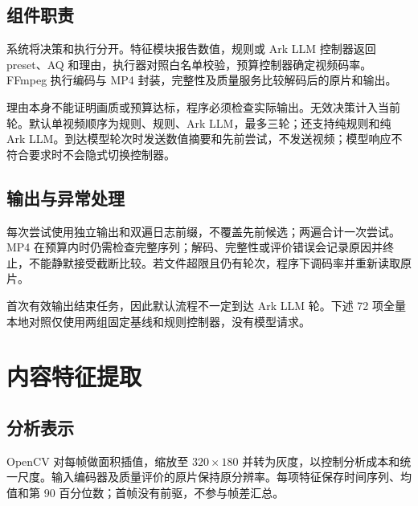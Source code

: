 \documentclass[UTF8,12pt,a4paper,twocolumn]{ctexart}
\begin{document}
\subsection{组件职责}
系统将决策和执行分开。特征模块报告数值，规则或 Ark LLM 控制器返回 preset、AQ 和理由，执行器对照白名单校验，预算控制器确定视频码率。FFmpeg 执行编码与 MP4 封装，完整性及质量服务比较解码后的原片和输出。

理由本身不能证明画质或预算达标，程序必须检查实际输出。无效决策计入当前轮。默认单视频顺序为规则、规则、Ark LLM，最多三轮；还支持纯规则和纯 Ark LLM。到达模型轮次时发送数值摘要和先前尝试，不发送视频；模型响应不符合要求时不会隐式切换控制器。
\begin{table}[H]\centering\caption{任务阶段及记录的证据。}\end{table}
\subsection{输出与异常处理}
每次尝试使用独立输出和双遍日志前缀，不覆盖先前候选；两遍合计一次尝试。MP4 在预算内时仍需检查完整序列；解码、完整性或评价错误会记录原因并终止，不能静默接受截断比较。若文件超限且仍有轮次，程序下调码率并重新读取原片。

首次有效输出结束任务，因此默认流程不一定到达 Ark LLM 轮。下述 72 项全量本地对照仅使用两组固定基线和规则控制器，没有模型请求。
\section{内容特征提取}
\subsection{分析表示}
OpenCV 对每帧做面积插值，缩放至 $320\times180$ 并转为灰度，以控制分析成本和统一尺度。输入编码器及质量评价的原片保持原分辨率。每项特征保存时间序列、均值和第 90 百分位数；首帧没有前驱，不参与帧差汇总。
\end{document}
